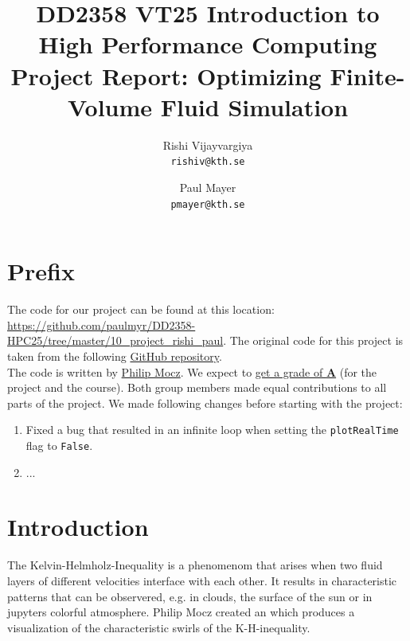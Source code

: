 \documentclass[a4paper,10pt]{article}
\title{
  \normalsize{DD2358 VT25 Introduction to}\\
  \normalsize{High Performance Computing}\\
  \large{Project Report: Optimizing Finite-Volume Fluid Simulation}
}
\author{
  \small Rishi Vijayvargiya\\[-0.75ex]
  \scriptsize\texttt{rishiv@kth.se}
  \and
  \small Paul Mayer\\[-0.75ex]
  \scriptsize\texttt{pmayer@kth.se}
}
\date{}
\begin{document}
\maketitle
\thispagestyle{firstpagestyle}

\listoftodos
{}
\vspace{1em}

%

\section*{Prefix}
The code for our project can be found at this location: \url{https://github.com/paulmyr/DD2358-HPC25/tree/master/10_project_rishi_paul}. The original code for this project is taken from the following \href{https://github.com/pmocz/finitevolume-python/blob/master/finitevolume.py}{GitHub repository}.\\
The code is written by \href{https://pmocz.github.io}{Philip Mocz}. We expect to \underline{get a grade of \textbf{A}} (for the project and the course). Both group members made equal contributions to all parts of the project.
We made following changes before starting with the project:

\begin{enumerate}
  \item Fixed a bug that resulted in an infinite loop when setting the \verb|plotRealTime| flag to \verb|False|.
  \item ...
\end{enumerate}

\tableofcontents
\newpage
\section{Introduction}
The Kelvin-Helmholz-Inequality is a phenomenom that arises when two fluid layers of different velocities interface with each other.
It results in characteristic patterns that can be observered, e.g. in clouds, the surface of the sun or in jupyters colorful atmosphere.
Philip Mocz created an which produces a visualization of the characteristic swirls of the K-H-inequality.
\end{document}
